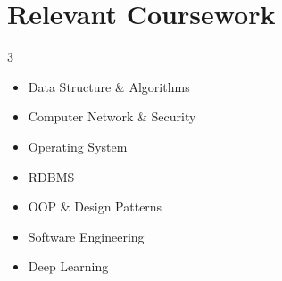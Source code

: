 \documentclass[letterpaper,11pt]{article}
\newcommand{\resumeSubHeadingListStart}{\begin{itemize}[leftmargin=0.0in, label={}]}
\newcommand{\resumeSubHeadingListEnd}{\end{itemize}}
\begin{document}
\section{Relevant Coursework}
\begin{multicols}{3}
  \begin{itemize}[itemsep=-5pt, parsep=3pt]
    \item\small Data Structure \& Algorithms
    \item Computer Network \& Security
    \item Operating System
    \item RDBMS
    \item OOP \& Design Patterns
    \item Software Engineering
    \item Deep Learning
  \end{itemize}
\end{multicols}
\vspace*{2.0\multicolsep}
\end{document}
